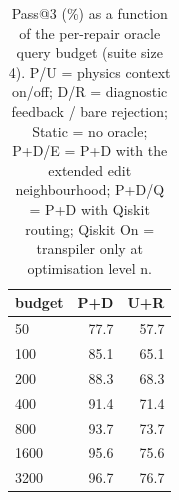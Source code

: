 \begin{table}[t]
\centering
\caption{Pass@3 (\%) as a function of the per-repair oracle query budget (suite size 4). P/U = physics context on/off; D/R = diagnostic feedback / bare rejection; Static = no oracle; P+D/E = P+D with the extended edit neighbourhood; P+D/Q = P+D with Qiskit routing; Qiskit On = transpiler only at optimisation level n.}
\label{tab:budget}
\footnotesize
\setlength{\tabcolsep}{3pt}
\begin{tabular}{lrr}
\toprule
budget & P+D & U+R \\
\midrule
50 & 77.7 & 57.7 \\
100 & 85.1 & 65.1 \\
200 & 88.3 & 68.3 \\
400 & 91.4 & 71.4 \\
800 & 93.7 & 73.7 \\
1600 & 95.6 & 75.6 \\
3200 & 96.7 & 76.7 \\
\bottomrule
\end{tabular}
\end{table}
